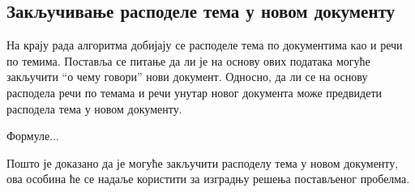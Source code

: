 \subsection{Закључивање расподеле тема у новом документу}

На крају рада алгоритма добијају се расподеле тема по документима као и речи по темима. Поставља се питање да ли је на основу ових података могуће закључити "`о чему говори"' нови документ. Односно, да ли се на основу расподела речи по темама и речи унутар новог документа може предвидети расподела тема у новом документу.

Формуле...

Пошто је доказано да је могуће закључити расподелу тема у новом документу, ова особина ће се надаље користити за изградњу решења постављеног пробелма.

